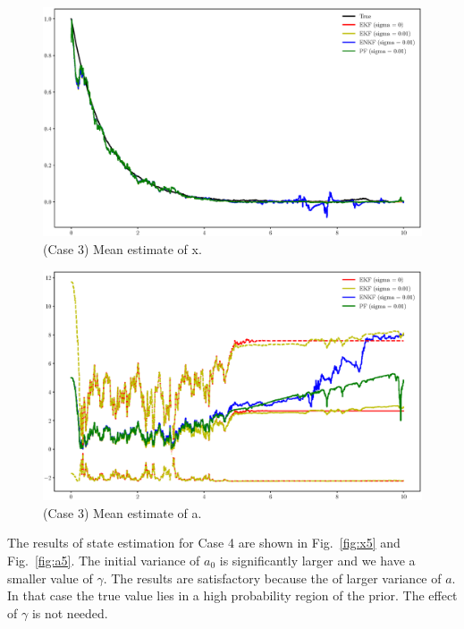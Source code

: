 \documentclass[]{elsarticle}
\begin{document}
\begin{figure}[!htb]
\centering
\includegraphics[width=\linewidth,keepaspectratio]{./figs/case00_x_estimate4.eps}
\caption{(Case 3) Mean estimate of x.}
\label{fig:x4}
\end{figure}

\begin{figure}[!htb]
\centering
\includegraphics[width=\linewidth,keepaspectratio]{./figs/case00_a_estimate4.eps}
\caption{(Case 3) Mean estimate of a.}
\label{fig:a4}
\end{figure}

The results of state estimation for Case 4 are shown in Fig.~\ref{fig:x5} and Fig.~\ref{fig:a5}. The initial variance of $a_0$ is significantly larger and we have a smaller value of $\gamma$. The results are satisfactory because the of larger variance of $a$. In that case the true value lies in a high probability region of the prior. The effect of $\gamma$ is not needed.
\end{document}
